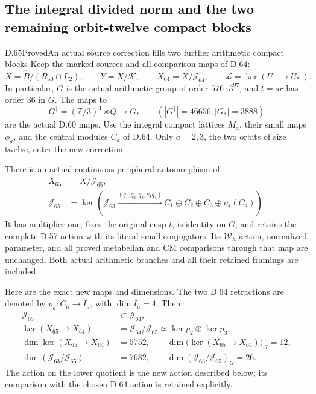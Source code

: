 \subsection{The integral divided norm and the two remaining orbit-twelve compact blocks}

\begin{statement}{D.65}{Proved}{An actual source correction fills two further arithmetic compact blocks}
Keep the marked sources and all comparison maps of D.64:
\[
 X=\widehat B/(R_{50}\cap L_2),\qquad Y=X/\mathcal K,
 \qquad X_{64}=X/\mathcal J_{64},\qquad
 \mathcal L=\ker(U^-\longrightarrow U_*^-).
 \tag{D.65.1}
\]
In particular, \(G\) is the actual arithmetic group of order
\(576\cdot3^{97}\), and \(t=sr\) has order 36 in \(G\).
The maps to
\[
 G^\dagger=(\mathbb Z/3)^4\rtimes Q\longrightarrow G_*\qquad
 (|G^\dagger|=46656, |G_*|=3888)
 \tag{D.65.2}
\]
are the actual D.60 maps. Use the integral compact lattices \(M_a\),
their small maps \(\phi_a\), and the central modules \(C_a\) of D.64.
Only \(a=2,3\), the two orbits of size twelve, enter the new correction.

There is an actual continuous peripheral automorphism of
\[
 \begin{aligned}
 X_{65}&=X/\mathcal J_{65},\\
 \mathcal J_{65}
   &=\ker\left(\mathcal J_{63}
       \xrightarrow{(q_1,q_2,q_3,\nu_4q_4)}
                  C_1\oplus C_2\oplus C_3\oplus\nu_4(C_4)\right).
 \end{aligned}
 \tag{D.65.3}
\]
It has multiplier one, fixes the original cusp \(t\), is identity on
\(G\), and retains the complete D.57 action with its literal small
conjugators. Its \(\mathcal W_h\) action, normalized parameter, and all
proved metabelian and CM comparisons through that map are unchanged.
Both actual arithmetic branches and all their retained framings are
included.

Here are the exact new maps and dimensions. The two D.64 retractions
are denoted by \(p_a:C_a\to I_a\), with \(\dim I_a=4\). Then
\[
 \begin{aligned}
 \mathcal J_{65}&\subset\mathcal J_{64},\\
 \ker(X_{65}\to X_{64})
       &=\mathcal J_{64}/\mathcal J_{65}
          \simeq\ker p_2\oplus\ker p_3,\\
 \dim\ker(X_{65}\to X_{64})&=5752,\qquad
 \dim\bigl(\ker(X_{65}\to X_{64})\bigr)_G=12,\\
 \dim(\mathcal J_{63}/\mathcal J_{65})&=7682,
       \qquad\dim(\mathcal J_{63}/\mathcal J_{65})_G=26.
 \end{aligned}
 \tag{D.65.4}
\]
The action on the lower quotient is the new action described below;
its comparison with the chosen D.64 action is retained explicitly.


\end{statement}
